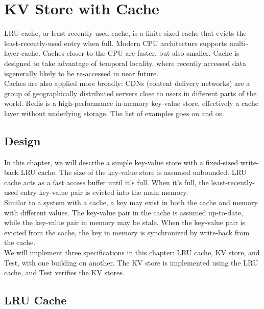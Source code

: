 % 

\usetikzlibrary{arrows.meta} %

\chapter{KV Store with Cache}

LRU cache, or least-recently-used cache, is a finite-sized cache that evicts the
least-recently-used entry when full. Modern CPU architecture supports
multi-layer cache. Caches closer to the CPU are faster, but also smaller. Cache
is designed to take advantage of temporal locality, where recently accessed data
isgenerally likely to be re-accessed in near future.\\

Caches are also applied more broadly: CDNs (content delivery networks) are a
group of geographically distributed servers close to users in different parts of
the world. Redis is a high-performance in-memory key-value store, effectively a
cache layer without underlying storage. The list of examples goes on and on.

\section{Design}

In this chapter, we will describe a simple key-value store with a fixed-sized 
write-back LRU cache. The size of the key-value store is assumed unbounded. LRU
cache acts as a fast access buffer until it's full. When it's full, the
least-recently-used entry key-value pair is evicted into the main memory.\\

Similar to a system with a cache, a key may exist in both the cache and memory
with different values. The key-value pair in the cache is assumed up-to-date,
while the key-value pair in memory may be stale. When the key-value pair is
evicted from the cache, the key in memory is synchronized by write-back from
the cache.\\

We will implement three specifications in this chapter: LRU cache, KV store, and
Test, with one building on another. The KV store is implemented using the LRU
cache, and Test verifies the KV stores.

\section{LRU Cache}

